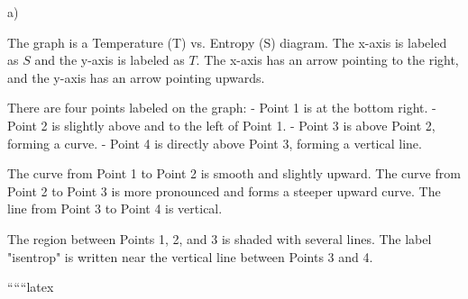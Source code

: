 a) 

The graph is a Temperature (T) vs. Entropy (S) diagram. The x-axis is labeled as \( S \) and the y-axis is labeled as \( T \). The x-axis has an arrow pointing to the right, and the y-axis has an arrow pointing upwards.

There are four points labeled on the graph:
- Point 1 is at the bottom right.
- Point 2 is slightly above and to the left of Point 1.
- Point 3 is above Point 2, forming a curve.
- Point 4 is directly above Point 3, forming a vertical line.

The curve from Point 1 to Point 2 is smooth and slightly upward. The curve from Point 2 to Point 3 is more pronounced and forms a steeper upward curve. The line from Point 3 to Point 4 is vertical.

The region between Points 1, 2, and 3 is shaded with several lines. The label "isentrop" is written near the vertical line between Points 3 and 4.

``````latex